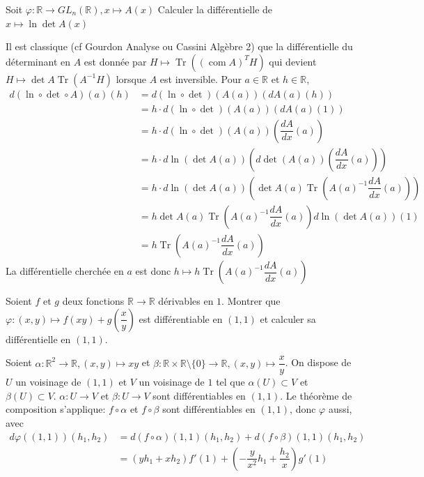 \documentclass{fancybook}
\DeclareMathOperator{\Tr}{Tr}
\begin{document}
\begin{exercice}
Soit $\varphi: \mathbb R \to GL_n(\mathbb R), x\mapsto A(x)$\newline
Calculer la différentielle de $x\mapsto \ln \det A(x)$
\end{exercice}
Il est classique (cf Gourdon Analyse ou Cassini Algèbre 2) que la différentielle du déterminant en $A$ est donnée par $H\mapsto \Tr((\operatorname{com} A)^TH)$ qui devient $H\mapsto \det A \Tr(A^{-1}H)$ lorsque $A$ est inversible.\newline 
Pour $a\in \mathbb R$ et $h\in \mathbb R$, $$\begin{aligned} 
d(\ln \circ \det \circ A)(a)(h) &= d(\ln \circ \det)(A(a))(dA(a)(h))\\
&= h \cdot d(\ln \circ \det)(A(a))(dA(a)(1)) \\
&= h \cdot d(\ln \circ \det)(A(a))( \dfrac{dA}{dx}(a) ) \\
&= h \cdot d\ln (\det A(a))\left( d\det (A(a))(\dfrac{dA}{dx}(a)) \right) \\
&= h \cdot d\ln (\det A(a))\left ( \det A(a) \Tr\left (A(a)^{-1}\dfrac{dA}{dx}(a)\right) \right)  \\
&= h \det A(a) \Tr\left (A(a)^{-1}\dfrac{dA}{dx}(a)\right) d\ln (\det A(a))(1) \\
&= h \Tr\left (A(a)^{-1}\dfrac{dA}{dx}(a)\right)
\end{aligned}$$
La différentielle cherchée en $a$ est donc $h\mapsto h \Tr\left (A(a)^{-1}\dfrac{dA}{dx}(a)\right)$

\begin{exercice}
Soient $f$ et $g$ deux fonctions $\mathbb R \to \mathbb R$ dérivables en $1$. Montrer que $\varphi:(x,y)\mapsto f(xy)+g(\dfrac{x}{y})$ est différentiable en $(1,1)$ et calculer sa différentielle en $(1,1)$.
\end{exercice}
Soient $\alpha:\mathbb R^2\to \mathbb R, (x,y)\mapsto xy$ et $\beta:\mathbb R\times \mathbb R\setminus\{0\} \to \mathbb R, (x,y)\mapsto \dfrac{x}{y}$.\newline
On dispose de $U$ un voisinage de $(1,1)$ et $V$ un voisinage de $1$ tel que $\alpha(U)\subset V$ et $\beta(U)\subset V$. $\alpha:U\to V$ et $\beta:U \to V$ sont différentiables en $(1,1)$.\newline 
 Le théorème de composition s'applique: $f\circ \alpha$ et $f\circ \beta$ sont différentiables en $(1,1)$, donc $\varphi$ aussi, avec 
 $$\begin{aligned} d\varphi((1,1))(h_1,h_2) &= d(f\circ \alpha)(1,1)(h_1,h_2)+d(f\circ \beta)(1,1)(h_1,h_2)\\
 &= (yh_1+xh_2)f'(1) + (-\dfrac{y}{x^2}h_1+\dfrac{h_2}{x})g'(1)
 \end{aligned}$$
\end{document}
